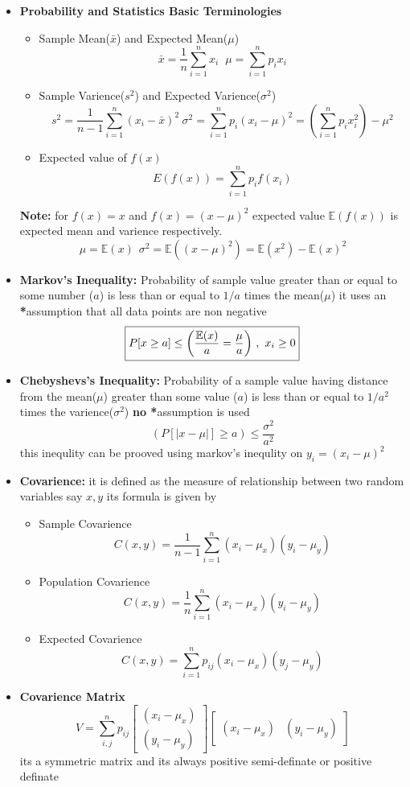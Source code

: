 \documentclass[a4paper]{article}
\numberwithin{equation}{section}
\begin{document}
\begin{itemize}
\item \textbf{Probability and Statistics Basic Terminologies}
\begin{itemize}
    \item Sample Mean($\bar{x}$) and Expected Mean($\mu$)
    \[\boxed{\bar{x}=\frac{1}{n}\sum_{i=1}^{n}x_i} \hspace{7pt} \boxed{\mu=\sum_{i=1}^{n}p_ix_i} \]
    \item Sample Varience($s^2$) and Expected Varience($\sigma^2$)
    \[ \boxed{s^2=\frac{1}{n-1}\sum_{i=1}^{n}(x_i-\bar{x})^2}\hspace{3pt}\boxed{\sigma^2=\sum_{i=1}^{n}p_i(x_i-\mu)^2=\left(\sum_{i=1}^{n}p_ix_i^2\right)-\mu^2}\]
    \item Expected value of $f(x)$
    \[E(f(x))=\sum_{i=1}^{n}p_if(x_i)\]
\end{itemize}
\textbf{Note: }for $f(x)=x$ and $f(x)=(x-\mu)^2$ expected value $\mathbb{E}(f(x))$ is expected mean and varience respectively.
\[\boxed{\mu=\mathbb{E}(x)} \hspace{5pt} \boxed{\sigma^2=\mathbb{E}((x-\mu)^2)=\mathbb{E}(x^2)-\mathbb{E}(x)^2}\]
\item \textbf{Markov's Inequality:} Probability of sample value greater than or equal to some number ($a$) is less than or equal to $1/a$ times the mean($\mu$) it uses an \textbf{*}assumption that all data points are non negative
\[\boxed{P[x\geq a]\leq \left(\frac{\mathbb{E}(x)}{a}=\frac{\mu}{a}\right) \hspace{1.5pt},\hspace{3.5pt} x_i\geq 0} \]
\item \textbf{Chebyshevs's Inequality:} Probability of a sample value having distance from the mean($\mu$) greater than some value ($a$) is less than or equal to $1/a^2$  times the varience($\sigma^2$) \textbf{no *}assumption is used
\[\boxed{\left(P[\vert x-\mu\vert]\geq a\right)\leq \frac{\sigma^2}{a^2}}\]
this inequlity can be prooved using markov's inequlity on $y_i=(x_i-\mu)^2$

\item \textbf{Covarience:} it is defined as the measure of relationship between two random variables say $x,y$ its formula is given by
\begin{itemize}
    \item Sample Covarience
    \[C(x,y)=\frac{1}{n-1}\sum_{i=1}^{n}(x_i-\mu_x)(y_i-\mu_y)\]
    \item Population Covarience
    \[C(x,y)=\frac{1}{n}\sum_{i=1}^{n}(x_i-\mu_x)(y_i-\mu_y)\]
    \item Expected Covarience
    \[C(x,y)=\sum_{i=1}^{n}p_{ij}(x_i-\mu_x)(y_j-\mu_y)\]
\end{itemize}
\item \textbf{Covarience Matrix}
\[
V=\sum_{i,j}^{n}p_{ij}
\begin{bmatrix}
    (x_i-\mu_x)\\(y_i-\mu_y)
\end{bmatrix}
\begin{bmatrix}
    (x_i-\mu_x)&(y_i-\mu_y)
\end{bmatrix}
\]
its a symmetric matrix and its always positive semi-definate or positive definate 


\end{itemize}
\end{document}
